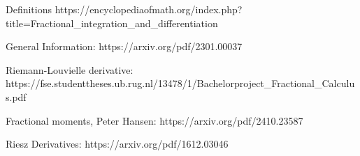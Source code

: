 Definitions https://encyclopediaofmath.org/index.php?title=Fractional_integration_and_differentiation

General Information: https://arxiv.org/pdf/2301.00037

Riemann-Louvielle derivative:
https://fse.studenttheses.ub.rug.nl/13478/1/Bachelorproject_Fractional_Calculus.pdf

Fractional moments, Peter Hansen: https://arxiv.org/pdf/2410.23587


Riesz Derivatives: https://arxiv.org/pdf/1612.03046